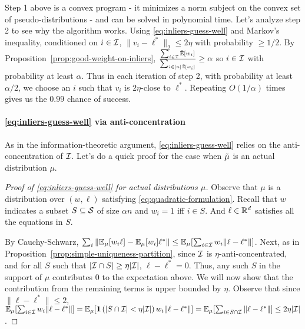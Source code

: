 Step 1 above is a convex program - it minimizes a norm subject on the convex set of pseudo-distributions - and can be solved in polynomial time. Let's analyze step 2 to see why the algorithm works. Using \eqref{eq:inliers-guess-well} and Markov's inequality, conditioned on $i \in \mathcal I$, $\|v_i - \ell^*\|_2 \leq 2 \eta$ with probability $\geq 1/2$. By Proposition~\ref{prop:good-weight-on-inliers}, $\frac{\sum_{i \in \mathcal I} \operatorname{\tilde{\mathbb{E}}}[w_i]}{\sum_{i \in [n] \operatorname{\tilde{\mathbb{E}}}[w_i]}} \geq \alpha$ so $i \in \mathcal I$ with probability at least $\alpha$. Thus in each iteration of step 2, with probability at least $\alpha/2$, we choose an $i$ such that $v_i$ is $2\eta$-close to $\ell^*$. Repeating $O(1/\alpha)$ times gives us the $0.99$ chance of success.

\paragraph{\eqref{eq:inliers-guess-well} via anti-concentration} As in the information-theoretic argument, \eqref{eq:inliers-guess-well} relies on the anti-concentration of $\mathcal I$.
Let's do a quick proof for the case when $\tilde{\mu}$ is an actual distribution $\mu$. 

\begin{proof}[Proof of \eqref{eq:inliers-guess-well} for actual distributions $\mu$]%
Observe that $\mu$ is a distribution over $(w,\ell)$ satisfying \eqref{eq:quadratic-formulation}. Recall that $w$ indicates a subset $S \subseteq \mathcal S$ of size $\alpha n$ and $w_i = 1$ iff $i \in S$. And $\ell \in \mathbb R^d$ satisfies all the equations in $S$.

By Cauchy-Schwarz, $\sum_i \|\mathbb{E}_\mu[w_i \ell] - \mathbb{E}_\mu[w_i] \ell^*\| \leq \mathbb{E}_{\mu} [\sum_{i \in \mathcal I} w_i \|\ell - \ell^*\|]$. 
Next, as in Proposition~\ref{prop:simple-uniqueness-partition}, since $\mathcal I$ is $\eta$-anti-concentrated, and for all $S$ such that $|\mathcal I \cap S| \geq \eta |\mathcal I|$,  $\ell-\ell^*= 0$. Thus, any such $S$ in the support of $\mu$ contributes $0$ to the expectation above. We will now show that the contribution from the remaining terms is upper bounded by $\eta$. Observe that since $\|\ell-\ell^*\| \leq 2$, \\$\mathbb{E}_\mu [\sum_{i \in \mathcal I} w_i \|\ell - \ell^*\|] = \mathbb{E}_\mu [\bm{1}\left(|S \cap \mathcal I|< \eta |\mathcal I|\right)w_i \|\ell - \ell^*\|] = \mathbb{E}_\mu [\sum_{i \in S \cap \mathcal I} \|\ell - \ell^*\|]  \leq 2\eta |\mathcal I|$.
\end{proof}



